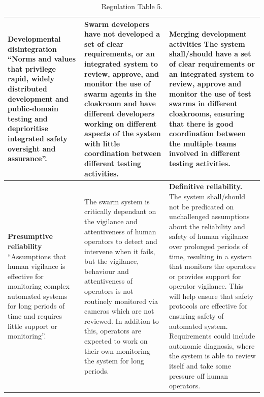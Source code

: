 \documentclass[lettersize,journal]{IEEEtran}
\begin{document}
\begin{landscape}
\begin{table}[]
\begin{tabular}{|p{0.3\textheight}|p{0.3\textheight}|p{0.4\textheight}|}
        \hline
        \textbf{Developmental disintegration} ``Norms and values that privilege rapid, widely distributed development and public-domain testing and deprioritise integrated safety oversight and assurance”. \cite{macrae2021learning} & Swarm developers have not developed a set of clear requirements, or an integrated system to review, approve, and monitor the use of swarm agents in the cloakroom and have different developers working on different aspects of the system with little coordination between different testing activities. & \textbf{Merging development activities} The system shall/should have a set of clear requirements or an integrated system to review, approve and monitor the use of test swarms in different cloakrooms, ensuring that there is good coordination between the multiple teams involved in different testing activities. \\
        \hline
        \textbf{Presumptive reliability } ``Assumptions that human vigilance is effective for monitoring complex automated systems for long periods of time and requires little support or monitoring”. \cite{macrae2021learning} & The swarm system is critically dependant on the vigilance and attentiveness of human operators to detect and intervene when it fails, but the vigilance, behaviour and attentiveness of operators is not routinely monitored via cameras which are not reviewed. In addition to this, operators are expected to work on their own monitoring the system for long periods. & \textbf{Definitive reliability.} The system shall/should not be predicated on unchallenged assumptions about the reliability and safety of human vigilance over prolonged periods of time, resulting in a system that monitors the operators or provides support for operator vigilance. This will help ensure that safety protocols are effective for ensuring safety of automated system. Requirements could include autonomic diagnosis, where the system is able to review itself and take some pressure off human operators. \\
        \hline
    \end{tabular}
    \caption{Regulation Table 5.}
    \label{tab:tab_5}
\end{table}
\end{landscape}

%
%


\vfill
\end{document}
